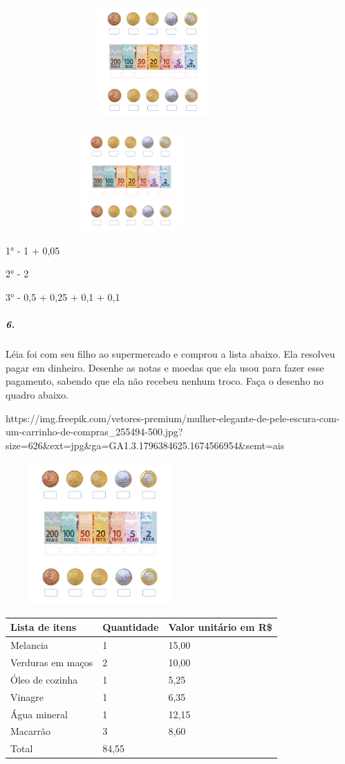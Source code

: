\includegraphics[width=4.45833in,height=1.68116in]{media/image72.png}

\includegraphics[width=3.80208in,height=1.51291in]{media/image73.png}

1° - 1 + 0,05

2° - 2

3° - 0,5 + 0,25 + 0,1 + 0,1

\subparagraph{6.}\label{section-62}

Léia foi com seu filho ao supermercado e comprou a lista abaixo. Ela
resolveu pagar em dinheiro. Desenhe as notas e moedas que ela usou para
fazer esse pagamento, sabendo que ela não recebeu nenhum troco. Faça o
desenho no quadro abaixo.

https://img.freepik.com/vetores-premium/mulher-elegante-de-pele-escura-com-um-carrinho-de-compras\_255494-500.jpg?size=626\&ext=jpg\&ga=GA1.3.1796384625.1674566954\&semt=ais

\includegraphics[width=2.86111in,height=2.14583in]{media/image74.png}

\begin{longtable}[]{@{}lll@{}}
\toprule
Lista de itens & Quantidade & Valor unitário em R\$\tabularnewline
\midrule
\endhead
Melancia & 1 & 15,00\tabularnewline
Verduras em maços & 2 & 10,00\tabularnewline
Óleo de cozinha & 1 & 5,25\tabularnewline
Vinagre & 1 & 6,35\tabularnewline
Água mineral & 1 & 12,15\tabularnewline
Macarrão & 3 & 8,60\tabularnewline
Total & 84,55\tabularnewline
\bottomrule
\end{longtable}

